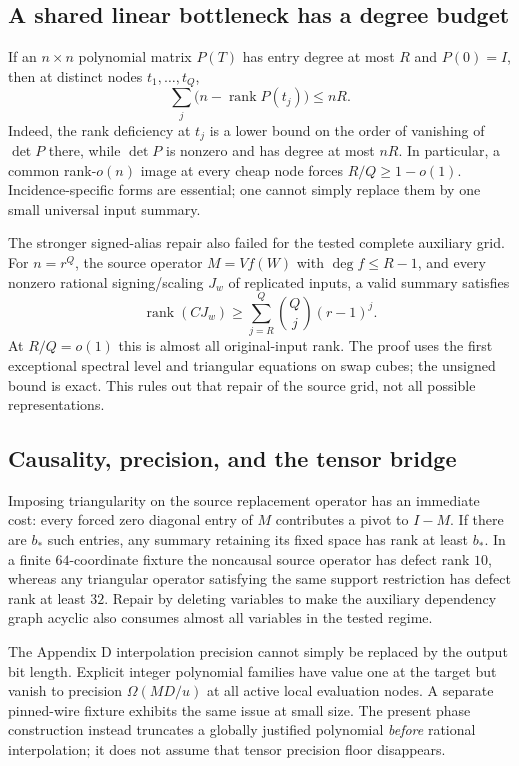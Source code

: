 \documentclass[11pt,a4paper]{article}
\theoremstyle{remark}\newtheorem{remark}[theorem]{Remark}
\begin{document}
\subsection{A shared linear bottleneck has a degree budget}
If an $n\times n$ polynomial matrix $P(T)$ has entry degree at most $R$
and $P(0)=I$, then at distinct nodes $t_1,\ldots,t_Q$,
\[
 \sum_j\bigl(n-\operatorname{rank}P(t_j)\bigr)\le nR.
\]
Indeed, the rank deficiency at $t_j$ is a lower bound on the order of
vanishing of $\det P$ there, while $\det P$ is nonzero and has degree
at most $nR$. In particular, a common rank-$o(n)$ image at every cheap
node forces $R/Q\ge1-o(1)$. Incidence-specific forms are essential;
one cannot simply replace them by one small universal input summary.

The stronger signed-alias repair also failed for the tested complete
auxiliary grid. For $n=r^Q$, the source operator $M=Vf(W)$ with
$\deg f\le R-1$, and every nonzero rational signing/scaling $J_w$ of
replicated inputs, a valid summary satisfies
\[
 \operatorname{rank}(CJ_w)\ge
 \sum_{j=R}^{Q}\binom Qj(r-1)^j.
\]
At $R/Q=o(1)$ this is almost all original-input rank. The proof uses
the first exceptional spectral level and triangular equations on swap
cubes; the unsigned bound is exact. This rules out that repair of the
source grid, not all possible representations.

\subsection{Causality, precision, and the tensor bridge}
Imposing triangularity on the source replacement operator has an immediate
cost: every forced zero diagonal entry of $M$ contributes a pivot to
$I-M$. If there are $b_*$ such entries, any summary retaining its fixed
space has rank at least $b_*$. In a finite $64$-coordinate fixture the
noncausal source operator has defect rank $10$, whereas any triangular
operator satisfying the same support restriction has defect rank at
least $32$. Repair by deleting variables to make the auxiliary dependency
graph acyclic also consumes almost all variables in the tested regime.

The Appendix D interpolation precision cannot simply be replaced by the
output bit length. Explicit integer polynomial families have value one
at the target but vanish to precision $\Omega(MD/u)$ at all active
local evaluation nodes. A separate pinned-wire fixture exhibits the
same issue at small size. The present phase construction instead
truncates a globally justified polynomial \emph{before} rational
interpolation; it does not assume that tensor precision floor disappears.
\end{document}
